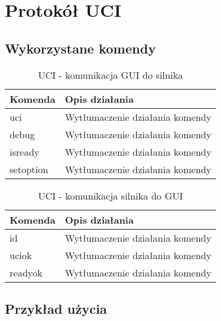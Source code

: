 \chapter{Protokół UCI}
\label{ch:protokol-uci}

\section{Wykorzystane komendy}
\label{sec:wykorzystane-komendy}

\begin{table}[htb] \small
\centering
\caption{UCI - komunikacja GUI do silnika}
\label{tab:UCI_GUI_silnik}
\begin{tabularx}{\linewidth}{|p{.25\linewidth}|X|}\hline
Komenda & Opis działania \\ \hline\hline

uci & Wytłumaczenie działania komendy \\ \hline
debug & Wytłumaczenie działania komendy \\ \hline
isready & Wytłumaczenie działania komendy \\ \hline
setoption & Wytłumaczenie działania komendy \\ \hline
\end{tabularx}
\end{table}

\begin{table}[htb] \small
\centering
\caption{UCI - komunikacja silnika do GUI}
\label{tab:UCI_silnik_GUI}
\begin{tabularx}{\linewidth}{|p{.25\linewidth}|X|}\hline
Komenda & Opis działania \\ \hline\hline

id & Wytłumaczenie działania komendy \\ \hline
uciok & Wytłumaczenie działania komendy \\ \hline
readyok & Wytłumaczenie działania komendy \\ \hline
\end{tabularx}
\end{table}

\section{Przykład użycia}
\label{sec:przyklad-uzycia}